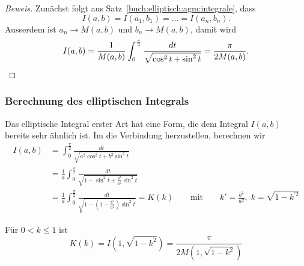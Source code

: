 \begin{proof}[Beweis]
Zunächst folgt aus Satz~\ref{buch:elliptisch:agm:integrale}, dass
\[
I(a,b)
=
I(a_1,b_1)
=
\dots
=
I(a_n,b_n).
\]
Ausserdem ist $a_n\to M(a,b)$ und $b_n\to M(a,b)$,
damit wird 
\[
I(a,b)
=
\frac{1}{M(a,b)}
\int_0^{\frac{\pi}2}
\frac{dt}{\sqrt{\cos^2 t + \sin^2 t}}
=
\frac{\pi}{2M(a,b)}.
\qedhere
\]
\end{proof}

%
%
\subsubsection{Berechnung des elliptischen Integrals}
Das elliptische Integral erster Art hat eine Form, die dem Integral
$I(a,b)$ bereits sehr ähnlich ist.
Im die Verbindung herzustellen, berechnen wir
\begin{align*}
I(a,b)
&=
\int_0^{\frac{\pi}2}
\frac{dt}{\sqrt{a^2\cos^2 t + b^2 \sin^2 t}}
\\
&=
\frac{1}{a}
\int_0^{\frac{\pi}2}
\frac{dt}{\sqrt{1-\sin^2 t + \frac{b^2}{a^2} \sin^2 t}}
\\
&=
\frac{1}{a}
\int_0^{\frac{\pi}2}
\frac{dt}{\sqrt{1-(1-\frac{b^2}{a^2})\sin^2 t}}
=
K(k)
\qquad\text{mit}\qquad
k'=\frac{b^2}{a^2},\;
k=\sqrt{1-k^{\prime 2}}
\end{align*}

\begin{satz}
%
\label{buch:elliptisch:agm:satz:Ek}
Für $0<k\le 1$ ist
\[
K(k) = I(1,\sqrt{1-k^2}) = \frac{\pi}{2M(1,\sqrt{1-k^2})}
\]
\end{satz}

%
%
